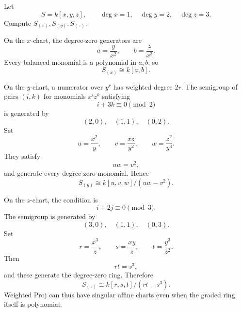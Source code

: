 \begin{problem}\label{prob:vi35-17}
Let
\[
S=k[x,y,z],
\qquad
\deg x=1,\quad \deg y=2,\quad \deg z=3.
\]
Compute \(S_{(x)},S_{(y)},S_{(z)}\).

\end{problem}

\ifdefined\FullProblemDossiers
\begin{solution}
On the \(x\)-chart, the degree-zero generators are
\[
a=\frac y{x^2},
\qquad
b=\frac z{x^3}.
\]
Every balanced monomial is a polynomial in \(a,b\), so
\[
\boxed{S_{(x)}\cong k[a,b]}.
\]

On the \(y\)-chart, a numerator over \(y^r\) has weighted degree \(2r\). The semigroup of pairs \((i,k)\) for
monomials \(x^iz^k\) satisfying
\[
i+3k\equiv0\pmod2
\]
is generated by
\[
(2,0),\quad(1,1),\quad(0,2).
\]
Set
\[
u=\frac{x^2}{y},
\qquad
v=\frac{xz}{y^2},
\qquad
w=\frac{z^2}{y^3}.
\]
They satisfy
\[
uw=v^2,
\]
and generate every degree-zero monomial. Hence
\[
\boxed{
S_{(y)}
\cong
k[u,v,w]/(uw-v^2).
}
\]

On the \(z\)-chart, the condition is
\[
i+2j\equiv0\pmod3.
\]
The semigroup is generated by
\[
(3,0),\quad(1,1),\quad(0,3).
\]
Set
\[
r=\frac{x^3}{z},
\qquad
s=\frac{xy}{z},
\qquad
t=\frac{y^3}{z^2}.
\]
Then
\[
rt=s^3,
\]
and these generate the degree-zero ring. Therefore
\[
\boxed{
S_{(z)}
\cong
k[r,s,t]/(rt-s^3).
}
\]
Weighted Proj can thus have singular affine charts even when the graded ring itself is polynomial.
\end{solution}
\fi
